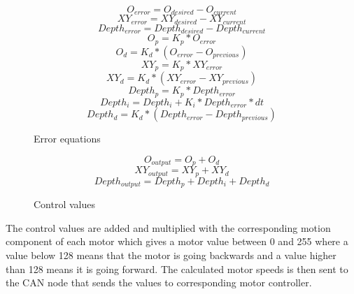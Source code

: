 \begin{center}
\begin{figure}[!ht]
\begin{equation}
O_{error}=O_{desired}-O_{current}
\label{pid_eq1}
\end{equation}
\begin{equation}
XY_{error}=XY_{desired}-XY_{current}
\end{equation}
\begin{equation}
Depth_{error}=Depth_{desired}-Depth_{current}
\end{equation}
\begin{equation}
O_{p}=K_{p}*O_{error}
\end{equation}
\begin{equation}
O_{d}=K_{d}*(O_{error} - O_{previous})
\end{equation}
\begin{equation}
XY_{p}=K_{p}*XY_{error}
\end{equation}
\begin{equation}
XY_{d}=K_{d}*(XY_{error} - XY_{previous})
\end{equation}
\begin{equation}
Depth_{p}=K_{p}*Depth_{error}
\end{equation}
\begin{equation}
Depth_{i}=Depth_{i} + K_{i}*Depth_{error}*dt
\end{equation}
\begin{equation}
Depth_{d}=K_{d}*(Depth_{error} - Depth_{previous})
\end{equation}
\caption{Error equations}
\end{figure}
\end{center}


\begin{center}
\begin{figure}[!ht]
\begin{equation}
O_{output}=O_{p}+O_{d}
\end{equation}
\begin{equation}
XY_{output}=XY_{p}+XY_{d}
\end{equation}
\begin{equation}
Depth_{output}=Depth_{p}+Depth_{i}+Depth_{d}
\label{pid_eq2}
\end{equation}
\caption{Control values}
\end{figure}
\end{center}

The control values are added and multiplied with the corresponding motion component of each motor which gives a motor value between 0 and 255 where a value below 128 means that the motor is going backwards and a value higher than 128 means it is going forward. The calculated motor speeds is then sent to the CAN node that sends the values to corresponding motor controller.

